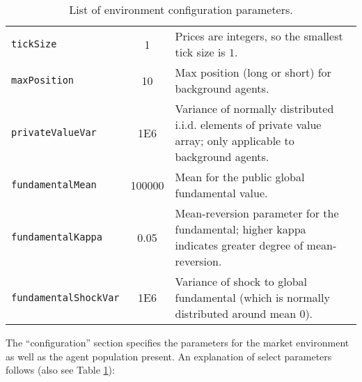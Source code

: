 \documentclass[11pt]{article}
\begin{document}
\begin{table}
\begin{tabular}[f]{p{} c p{}}
\texttt{tickSize} 		& 1 & Prices are integers, so the smallest tick size is $1$. \\

\texttt{maxPosition} 	& 10 & Max position (long or short) for background agents. \\
\texttt{privateValueVar} & 1E6 & Variance of normally distributed i.i.d. elements of private value array; only applicable to background agents. \\
\texttt{fundamentalMean} 	& 100000 & Mean for the public global fundamental value.\\
\texttt{fundamentalKappa} 		& 0.05 & Mean-reversion parameter for the fundamental; higher kappa indicates greater degree of mean-reversion.\\
\texttt{fundamentalShockVar} 		& 1E6 & Variance of shock to global fundamental (which is normally distributed around mean 0).\\



\end{tabular}
\caption{List of environment configuration parameters.}
\label{tab:configs}
\end{table}

The ``configuration'' section specifies the parameters for the market environment as well as the agent population present.
%
An explanation of select parameters follows (also see Table \ref{tab:configs}):
\end{document}
